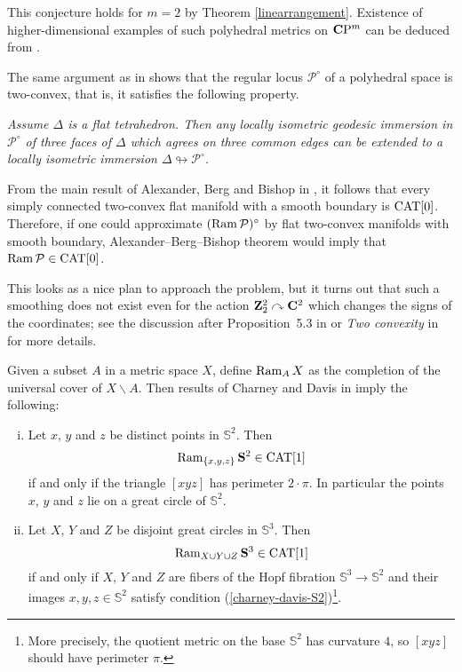 \documentclass{compositio}
\begin{document}
This conjecture holds for $m=2$ by Theorem \ref{linearrangement}. 
Existence of higher-dimensional examples 
of such polyhedral metrics on $\mathbf{C}\mathrm{P}^m$ can be deduced from 
\cite{looijenga}.

The same argument as in \cite{panov-petrunin} shows that the regular locus $\mathcal{P}^\circ$ of a polyhedral space is two-convex,
that is, it satisfies the following property.

\emph{Assume $\Delta$ is a flat tetrahedron.
Then any locally isometric geodesic immersion in  $\mathcal{P}^\circ$
of three faces of $\Delta$ which agrees on three common edges  can be extended to a
locally isometric immersion $\Delta\looparrowright \mathcal{P}^\circ$.}

From the main result of Alexander, Berg and Bishop  in \cite{ABB},
it follows that every simply connected two-convex flat manifold with a smooth boundary is $\mathrm{CAT}[0]$. Therefore, if one could approximate  $(\mathop{\rm Ram}\nolimits  \mathcal{P})^\circ$ by flat two-convex manifolds with smooth boundary, Alexander--Berg--Bishop theorem would imply that $\Ram  \mathcal{P}\z\in\CAT[0]$.

This looks as a nice plan to approach the problem, but it turns out that such a smoothing does not exist even for the action $\mathbf{Z}_2^2\curvearrowright\mathbf{C}^2$ which changes the signs of the coordinates;
see the discussion after Proposition~5.3 in \cite{panov-petrunin}
or \emph{Two convexity} in \cite{petrunin-orthodox} for more details.

Given a subset $A$ in a metric space $X$,
define $\mathop{\rm Ram}\nolimits_A X$ as  the completion of the universal cover of $X\backslash A$.
Then results of  Charney and Davis in \cite{charney-davis-93} imply the following:
\begin{enumerate}[(i)]
\item\label{charney-davis-S2} Let $x$, $y$ and $z$ be distinct points in $\mathbb{S}^2$.
Then
$$\mathop{\rm Ram}\nolimits_{\{x,y,z\}}\mathbf{S}^2\in \mathrm{CAT}[1]$$
if and only if the triangle $[xyz]$ has perimeter $2\cdot\pi$.
In particular the points $x$, $y$ and $z$ lie on a great circle of $\mathbb{S}^2$.
\item\label{charney-davis-S3}
Let $X$, $Y$ and $Z$ be disjoint great circles in $\mathbb{S}^3$.
Then
$$\mathop{\rm Ram}\nolimits_{X\cup Y\cup Z}\mathbf{S}^3\in\mathrm{CAT}[1]$$ if and only if $X$, $Y$ and $Z$ are fibers of the Hopf fibration $\mathbb{S}^3\to \mathbb{S}^2$ and their images $x,y,z\in \mathbb{S}^2$ satisfy condition (\ref{charney-davis-S2})\footnote{More precisely, the  quotient metric on the base $\mathbb{S}^2$ has curvature $4$, so $[xyz]$ should have perimeter $\pi$.}.
\end{enumerate}
\end{document}
